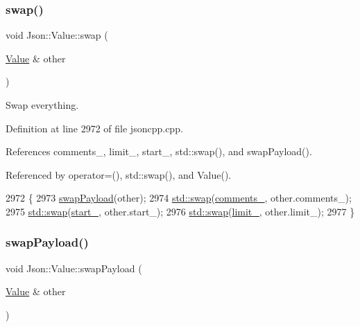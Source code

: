 \subsubsection{\texorpdfstring{swap()}{swap()}}
{\footnotesize\ttfamily void Json\+::\+Value\+::swap (\begin{DoxyParamCaption}\item[{\hyperlink{class_json_1_1_value}{Value} \&}]{other }\end{DoxyParamCaption})}



Swap everything. 



Definition at line 2972 of file jsoncpp.\+cpp.



References comments\+\_\+, limit\+\_\+, start\+\_\+, std\+::swap(), and swap\+Payload().



Referenced by operator=(), std\+::swap(), and Value().


\begin{DoxyCode}
2972                              \{
2973   \hyperlink{class_json_1_1_value_a5263476047f20e2fc6de470e4de34fe5}{swapPayload}(other);
2974   \hyperlink{namespacestd_a22cc6fcbbb1f2f705c7888b615e43582}{std::swap}(\hyperlink{class_json_1_1_value_a2016564cabc7a29208e97bd0b782a4e4}{comments\_}, other.comments\_);
2975   \hyperlink{namespacestd_a22cc6fcbbb1f2f705c7888b615e43582}{std::swap}(\hyperlink{class_json_1_1_value_a1c3aeb0fa8fefe93776cb347c76a25a8}{start\_}, other.start\_);
2976   \hyperlink{namespacestd_a22cc6fcbbb1f2f705c7888b615e43582}{std::swap}(\hyperlink{class_json_1_1_value_afe377e25f6d3b5b8ea7221c84f29412a}{limit\_}, other.limit\_);
2977 \}
\end{DoxyCode}
\mbox{\label{class_json_1_1_value_a5263476047f20e2fc6de470e4de34fe5}} 
\subsubsection{\texorpdfstring{swap\+Payload()}{swapPayload()}}
{\footnotesize\ttfamily void Json\+::\+Value\+::swap\+Payload (\begin{DoxyParamCaption}\item[{\hyperlink{class_json_1_1_value}{Value} \&}]{other }\end{DoxyParamCaption})}



